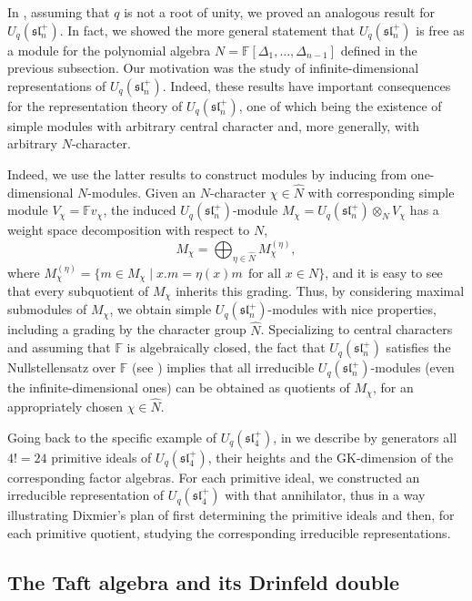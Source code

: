 \documentclass{commat}
\newcommand{\FF}{\mathbb{F}}
\newcommand{\fsl}{\mathfrak{sl}}
\begin{document}
In \cite[Thm.\ 2]{sL05}, assuming that $q$ is not a root of unity, we proved an analogous result for $U_q(\fsl_n^+)$. In fact, we showed the more general statement that $U_q(\fsl_n^+)$ is free as a module for the polynomial algebra $N=\FF[\Delta_1, \ldots, \Delta_{n-1}]$ defined in the previous subsection. Our motivation was the study of infinite-dimensional representations of $U_q(\fsl_n^+)$. Indeed, these results have important consequences for the representation theory of $U_q(\fsl_n^+)$, one of which being the existence of simple modules with arbitrary central character and, more generally, with arbitrary $N$-character. 

Indeed, we use the latter results to construct modules by inducing from one-dimensional $N$-modules. Given an 
$N$-character $\chi\in \widehat{N}$ with corresponding simple module 
$V_{\chi}=\FF v_{\chi}$, the induced $U_q(\fsl_n^+)$-module $M_{\chi}=U_q(\fsl_n^+)\otimes_{N}V_{\chi}$ has a weight space decomposition with respect to $N$,
\[
M_{\chi}=\bigoplus_{\eta\in \widehat{N}} M_{\chi}^{(\eta)},
\]
where $M_{\chi}^{(\eta)}=\{ m\in M_{\chi} \mid x.m=\eta (x)m \ \  \mbox{for all $x\in N$} \}$, and it is easy to see that every subquotient of $M_{\chi}$ inherits this grading. Thus, by considering maximal submodules of 
$M_{\chi}$, we obtain simple $U_q(\fsl_n^+)$-modules with nice properties, including a grading by the character group $\widehat{N}$. Specializing to central characters and assuming that $\FF$ is algebraically closed, the fact that $U_q(\fsl_n^+)$ satisfies the Nullstellensatz over $\FF$ (see \cite[Thm.\ 9.4.21]{MR00}) implies that all irreducible $U_q(\fsl_n^+)$-modules (even the infinite-dimensional ones) can be obtained as quotients of $M_{\chi}$, for an appropriately chosen $\chi\in \widehat{N}$.



Going back to the specific example of $U_q(\fsl_4^+)$, in \cite[Sec.\ 4.3]{sL06} we describe by generators all $4!=24$ primitive ideals of $U_q(\fsl_4^+)$, their heights and the GK-dimension of the corresponding factor algebras. For each primitive ideal, we constructed an irreducible representation of $U_q(\fsl_4^+)$ with that annihilator, thus in a way illustrating Dixmier's plan of first determining the primitive ideals and then, for each primitive quotient, studying the corresponding irreducible representations.

\subsection{The Taft algebra and its Drinfeld double}\label{SS:rep:ta}
\end{document}

